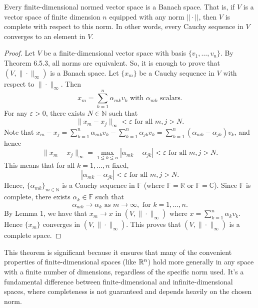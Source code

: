 \begin{theorem}
    Every finite-dimensional normed vector space is a Banach space. That is, if \( V \) is a vector space of finite dimension \( n \) equipped with any norm \( ||\cdot|| \), then \( V \) is complete with respect to this norm. In other words, every Cauchy sequence in \( V \) converges to an element in \( V \).
\end{theorem}

\begin{proof}
Let \( V \) be a finite-dimensional vector space with basis \( \{v_1, \ldots, v_n\} \). By Theorem 6.5.3, all norms are equivalent. So, it is enough to prove that \( (V, \|\cdot\|_{\infty}) \) is a Banach space. Let \( \{x_m\} \) be a Cauchy sequence in \( V \) with respect to \( \|\cdot\|_{\infty} \). Then
\[ 
x_m = \sum_{k=1}^{n} \alpha_{mk} v_k \text{ with } \alpha_{mk} \text{ scalars}.
\]
For any \( \varepsilon > 0 \), there exists \( N \in \mathbb{N} \) such that
\[
\|x_m - x_j\|_{\infty} < \varepsilon \text{ for all } m,j > N.
\]
Note that \( x_m - x_j = \sum_{k=1}^{n} \alpha_{mk} v_k - \sum_{k=1}^{n} \alpha_{jk} v_k = \sum_{k=1}^{n} (\alpha_{mk} - \alpha_{jk}) v_k \), and hence
\[
\|x_m - x_j\|_{\infty} = \max_{1 \leq k \leq n} |\alpha_{mk} - \alpha_{jk}| < \varepsilon \text{ for all } m,j > N.
\]
This means that for all \( k=1, \ldots, n \) fixed,
\[
|\alpha_{mk} - \alpha_{jk}| < \varepsilon \text{ for all } m,j > N.
\]
Hence, \( \{\alpha_{mk}\}_{m \in \mathbb{N}} \) is a Cauchy sequence in \( \mathbb{F} \) (where \( \mathbb{F} = \mathbb{R} \) or \( \mathbb{F} = \mathbb{C} \)). Since \( \mathbb{F} \) is complete, there exists \( \alpha_k \in \mathbb{F} \) such that
\[
\alpha_{mk} \rightarrow \alpha_k \text{ as } m \rightarrow \infty, \text{ for } k=1, \ldots, n.
\]
By Lemma 1, we have that \( x_m \rightarrow x \) in \( (V, \|\cdot\|_{\infty}) \) where \( x = \sum_{k=1}^{n} \alpha_k v_k \).
Hence \( \{x_m\} \) converges in \( (V, \|\cdot\|_{\infty}) \). This proves that \( (V, \|\cdot\|_{\infty}) \) is a complete space.
\end{proof}
This theorem is significant because it ensures that many of the convenient properties of finite-dimensional spaces (like
$\mathbb R^n$) hold more generally in any space with a finite number of dimensions, regardless of the specific norm used. It's a fundamental difference between finite-dimensional and infinite-dimensional spaces, where completeness is not guaranteed and depends heavily on the chosen norm.


